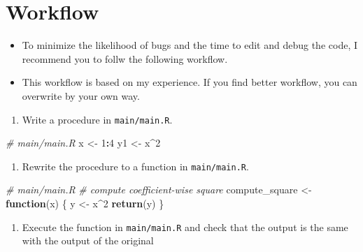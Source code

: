 \documentclass[]{book}
\newenvironment{Shaded}{\begin{snugshade}}{\end{snugshade}}
\newcommand{\KeywordTok}[1]{\textcolor[rgb]{0.13,0.29,0.53}{\textbf{#1}}}
\newcommand{\DecValTok}[1]{\textcolor[rgb]{0.00,0.00,0.81}{#1}}
\newcommand{\StringTok}[1]{\textcolor[rgb]{0.31,0.60,0.02}{#1}}
\newcommand{\CommentTok}[1]{\textcolor[rgb]{0.56,0.35,0.01}{\textit{#1}}}
\newcommand{\ControlFlowTok}[1]{\textcolor[rgb]{0.13,0.29,0.53}{\textbf{#1}}}
\newcommand{\OperatorTok}[1]{\textcolor[rgb]{0.81,0.36,0.00}{\textbf{#1}}}
\newcommand{\NormalTok}[1]{#1}
\providecommand{\tightlist}{%
  \setlength{\itemsep}{0pt}\setlength{\parskip}{0pt}}
\begin{document}
\section{Workflow}\label{workflow}

\begin{itemize}
\tightlist
\item
  To minimize the likelihood of bugs and the time to edit and debug the
  code, I recommend you to follw the following workflow.
\item
  This workflow is based on my experience. If you find better workflow,
  you can overwrite by your own way.
\end{itemize}

\begin{enumerate}
\def\labelenumi{\arabic{enumi}.}
\tightlist
\item
  Write a procedure in \texttt{main/main.R}.
\end{enumerate}

\begin{Shaded}
\begin{Highlighting}[]
\CommentTok{# main/main.R}
\NormalTok{x <-}\StringTok{ }\DecValTok{1}\OperatorTok{:}\DecValTok{4}
\NormalTok{y1 <-}\StringTok{ }\NormalTok{x}\OperatorTok{^}\DecValTok{2}
\end{Highlighting}
\end{Shaded}

\begin{enumerate}
\def\labelenumi{\arabic{enumi}.}
\setcounter{enumi}{1}
\tightlist
\item
  Rewrite the procedure to a function in \texttt{main/main.R}.
\end{enumerate}

\begin{Shaded}
\begin{Highlighting}[]
\CommentTok{# main/main.R}
\CommentTok{# compute coefficient-wise square}
\NormalTok{compute_square <-}
\StringTok{  }\ControlFlowTok{function}\NormalTok{(x) \{}
\NormalTok{    y <-}\StringTok{ }\NormalTok{x}\OperatorTok{^}\DecValTok{2}
    \KeywordTok{return}\NormalTok{(y)}
\NormalTok{  \}}
\end{Highlighting}
\end{Shaded}

\begin{enumerate}
\def\labelenumi{\arabic{enumi}.}
\setcounter{enumi}{2}
\tightlist
\item
  Execute the function in \texttt{main/main.R} and check that the output
  is the same with the output of the original
\end{enumerate}
\end{document}
